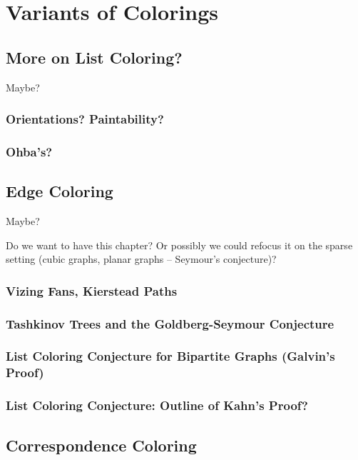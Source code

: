 \documentclass[12pt,twoside,openright,a4paper]{book}
\begin{document}
\part{Variants of Colorings}

\chapter{More on List Coloring?}

Maybe?

\section{Orientations? Paintability?}
\section{Ohba's?}

\chapter{Edge Coloring}

Maybe?

Do we want to have this chapter?  Or possibly we could refocus it on the
sparse setting (cubic graphs, planar graphs -- Seymour's conjecture)?

\section{Vizing Fans, Kierstead Paths}
\section{Tashkinov Trees and the Goldberg-Seymour Conjecture}
\section{List Coloring Conjecture for Bipartite Graphs (Galvin's Proof)}
\section{List Coloring Conjecture: Outline of Kahn's Proof?}

\chapter{Correspondence Coloring}\label{chap:corresp}

\end{document}
